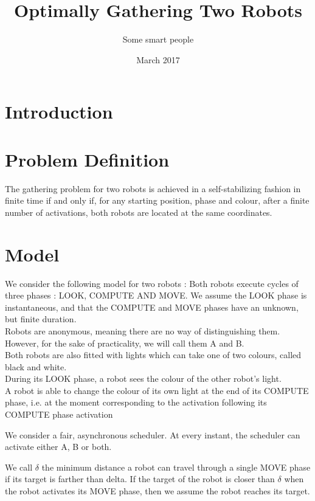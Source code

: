 \documentclass[11pt]{article}
\title{Optimally Gathering Two Robots}
\author{Some smart people}
\date{March 2017}
\begin{document}
\maketitle

\section{Introduction}

\section{Problem Definition}


The gathering problem for two robots is achieved in a self-stabilizing fashion in finite time if and only if, for any starting position, phase and colour, after a finite number of activations, both robots are located at the same coordinates.

\section{Model}



We consider the following model for two robots : 
Both robots execute cycles of three phases : LOOK, COMPUTE AND MOVE.
We assume the LOOK phase is instantaneous, and that the COMPUTE and MOVE phases have an unknown, but finite duration.
\\
Robots are anonymous, meaning there are no way of distinguishing them. However, for the sake of practicality, we will call them A and B.
\\
Both robots are also fitted with lights which can take one of two colours, called black and white.
\\
During its LOOK phase, a robot sees the colour of the other robot's light.
\\
A robot is able to change the colour of its own light at the end of its COMPUTE phase, i.e. at the moment corresponding to the activation following its COMPUTE phase activation

We consider a fair, asynchronous scheduler. 
At every instant, the scheduler can activate either A, B or both.



We call $\delta$ the minimum distance a robot can travel through a single MOVE phase if its target is farther than delta. If the target of the robot is closer than $\delta$ when the robot activates its MOVE phase, then we assume the robot reaches its target.
\end{document}
